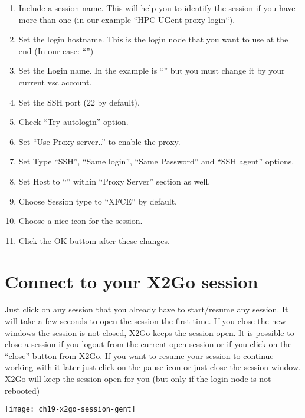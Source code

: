 \begin{enumerate}
    \item  Include a session name. This will help you to identify 
    the session if you have more than one (in our example ``HPC UGent proxy login``).
    \item  Set the login hostname. This is the login node that you want to use at the end
    (In our case: ``\strong{\emph{\loginhost{}}}'')
    \item  Set the Login name. In the example is ``'' but you must change it by your
    current vsc account.
    \item  Set the SSH port (22 by default).
    \item  Check ``Try autologin'' option.
    \item  Set ``Use Proxy server..'' to enable the proxy.
    \item  Set Type ``SSH'', ``Same login'', ``Same Password'' and ``SSH agent'' options.
    \item  Set Host to ``\strong{\emph{\loginnode}}'' within ``Proxy Server'' section as well.
    \item  Choose Session type to ``XFCE'' by default.
    \item  \strong{[optional]:} Choose a nice icon for the session.
    \item  Click the OK buttom after these changes.
\end{enumerate}

\section{Connect to your X2Go session}
\label{sec:connect-x2go}
Just click on any session that you already have to start/resume any session. It will take a few seconds to open the session the first time.
If you close the new windows the session is not closed, X2Go keeps the session open. It is possible to close a session if you logout from the current open session or if you click on the ``close'' button from X2Go. If you want to resume your session to continue working with it later just click on the pause icon or just close the session window. X2Go will keep the session open for you (but only if the login node is not rebooted)

\begin{center}
\texttt{[image: ch19-x2go-session-gent]}
\end{center}

